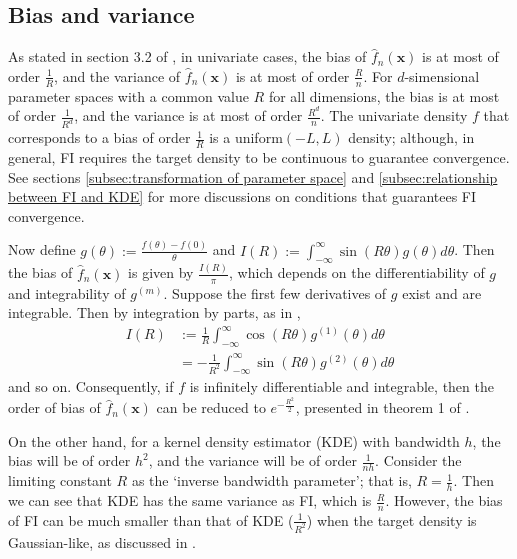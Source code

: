 \documentclass[%
 reprint,
 amsmath,amssymb,
 aps,
]{revtex4-2}
\begin{document}
%
\subsection{\label{subsec:FI bias and variance} Bias and variance}
%
As stated in section 3.2 of \cite{rotiroti2022computing}, in univariate cases, the bias of $\hat{f}_n(\mathbf{x})$ is at most of order $\frac{1}{R}$, and the variance of $\hat{f}_n(\mathbf{x})$ is at most of order $\frac{R}{n}$. For $d$-simensional parameter spaces with a common value $R$ for all dimensions, the bias is at most of order $\frac{1}{R^d}$, and the variance is at most of order $\frac{R^d}{n}$. The univariate density $f$ that corresponds to a bias of order $\frac{1}{R}$ is a uniform$(-L, L)$ density; although, in general, FI requires the target density to be continuous to guarantee convergence. See sections \ref{subsec:transformation of parameter space} and \ref{subsec:relationship between FI and KDE} for more discussions on conditions that guarantees FI convergence.

Now define $\displaystyle g(\theta) := \frac{f(\theta) - f(0)}{\theta}$ and $\displaystyle I(R) := \int_{-\infty}^\infty \sin(R\theta)g(\theta)d\theta$. Then the bias of $\hat{f}_n(\mathbf{x})$ is given by $\displaystyle \frac{I(R)}{\pi}$, which depends on the differentiability of $g$ and integrability of $g^{(m)}$. Suppose the first few derivatives of $g$ exist and are integrable. Then by integration by parts, as in \cite{rotiroti2022computing},
\begin{align*}
    I(R) & := \frac{1}{R} \int_{-\infty}^\infty \cos(R\theta)g^{(1)}(\theta)d\theta \\
    & = -\frac{1}{R^2} \int_{-\infty}^\infty \sin(R\theta)g^{(2)}(\theta)d\theta
\end{align*}
and so on. Consequently, if $f$ is infinitely differentiable and integrable, then the order of bias of $\hat{f}_n(\mathbf{x})$ can be reduced to $e^{-\frac{R^2}{2}}$, presented in theorem 1 of \cite{rotiroti2022computing}.

On the other hand, for a kernel density estimator (KDE) with bandwidth $h$, the bias will be of order $h^2$, and the variance will be of order $\frac{1}{nh}$. Consider the limiting constant $R$ as the `inverse bandwidth parameter'; that is, $R = \frac{1}{h}$. Then we can see that KDE has the same variance as FI, which is $\frac{R}{n}$. However, the bias of FI can be much smaller than that of KDE ($\frac{1}{R^2}$) when the target density is Gaussian-like, as discussed in \cite{rotiroti2022computing}.
\end{document}
